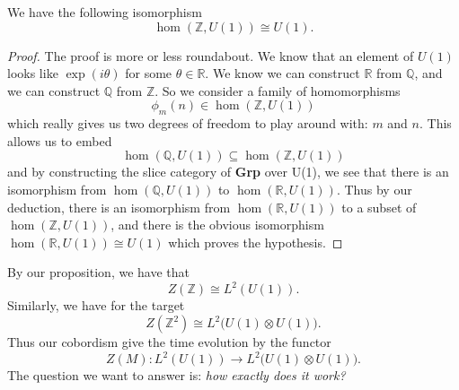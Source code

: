 \documentclass{amsart}
\numberwithin{equation}{section}
\begin{document}
\begin{prop}%
We have the following isomorphism
\begin{equation}%
\hom(\mathbb{Z},U(1))\cong U(1).
\end{equation}
\end{prop}
\begin{proof}
The proof is more or less roundabout. We know that an element of
$U(1)$ looks like $\exp(i\theta)$ for some
$\theta\in\mathbb{R}$. We know we can construct $\mathbb{R}$ from
$\mathbb{Q}$, and we can construct $\mathbb{Q}$ from
$\mathbb{Z}$. So we consider a family of homomorphisms
\begin{equation}%
\phi_{m}(n)\in\hom(\mathbb{Z},U(1))
\end{equation}
which really gives us two degrees of freedom to play around with:
$m$ and $n$. This allows us to embed 
\begin{equation}%
\hom(\mathbb{Q},U(1))\subseteq\hom(\mathbb{Z},U(1))
\end{equation}
and by constructing the slice category of \textbf{Grp} over U(1),
we see that there is an isomorphism from $\hom(\mathbb{Q},U(1))$
to $\hom(\mathbb{R},U(1))$. Thus by our deduction, there is an
isomorphism from $\hom(\mathbb{R},U(1))$ to a subset of
$\hom(\mathbb{Z},U(1))$, and there is the obvious isomorphism
$\hom(\mathbb{R},U(1))\cong U(1)$ which proves the hypothesis.
\end{proof}

By our proposition, we have that
\begin{equation}%
Z(\mathbb{Z})\cong L^{2}(U(1)).
\end{equation}
Similarly, we have for the target
\begin{equation}%
Z(\mathbb{Z}^{2})\cong L^{2}\Big(U(1)\otimes U(1)\Big).
\end{equation}
Thus our cobordism give the time evolution by the functor
\begin{equation}%
Z(M): L^{2}(U(1))\to L^{2}\Big(U(1)\otimes U(1)\Big).
\end{equation}
The question we want to answer is: \emph{how exactly does it work?}

\nocite{*}


\end{document}

